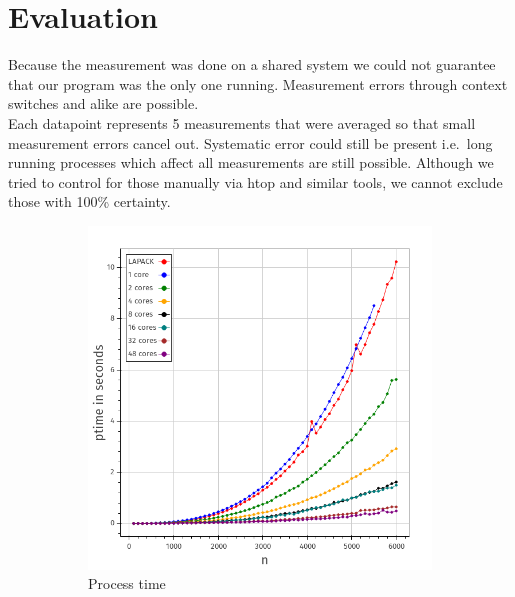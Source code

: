 \documentclass[a4paper,final,ngerman,english]{article}
\begin{document}
\section{Evaluation}
Because the measurement was done on a shared system
we could not guarantee that our program was the only one running.
Measurement errors through context switches and alike are possible.\\
Each datapoint represents 5 measurements that were averaged so that small measurement errors cancel out.
Systematic error could still be present i.e.\ long running processes which affect all measurements
are still possible. Although we tried to control for those manually via htop and similar tools, we cannot exclude
those with 100\% certainty.

\begin{figure}[h!]
	\centering
	\begin{subfigure}{0.46\textwidth}
		\includegraphics[width=\textwidth]{ptime}
		\caption{Process time}
\label{fig:runtime}
	\end{subfigure}
	\begin{subfigure}{0.46\textwidth}

\end{subfigure}
\end{figure}
\end{document}
